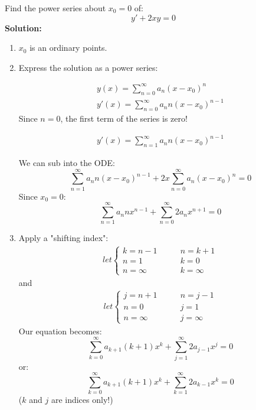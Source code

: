\begin{exmp}{}
Find the power series about $x_0=0$ of:
\begin{equation*}
y'+2xy=0
\end{equation*}
\textbf{Solution:}\\
\begin{enumerate}
\item $x_0$ is an ordinary points.
\item Express the solution as a power series:

\begin{align*}
y(x) = \sum^\infty_{n=0} a_n\left(x-x_0\right)^n\\
y'(x) = \sum^\infty_{n=0} a_n n\left(x-x_0\right)^{n-1}
\end{align*}
Since $n=0$, the first term of the series is zero!

\begin{align*}
y'(x) = \sum^\infty_{n=1} a_n n\left(x-x_0\right)^{n-1}
\end{align*}

We can sub into the ODE:
\begin{equation*}
\sum^\infty_{n=1} a_n n\left(x-x_0\right)^{n-1}+2x\sum^\infty_{n=0} a_n\left(x-x_0\right)^n=0
\end{equation*}
Since $x_0=0$:
\begin{equation*}
\sum^\infty_{n=1} a_n nx^{n-1}+\sum^\infty_{n=0} 2a_nx^{n+1}=0 %
\end{equation*}
\item Apply a "shifting index":
\begin{align*}
let \begin{cases}
k=n-1 \qquad &n=k+1\\
n=1 &k=0\\
n=\infty &k=\infty
\end{cases}
\end{align*}
 and 
 \begin{align*}
let \begin{cases}
j=n+1 \qquad &n=j-1\\
n=0 &j=1\\
n=\infty &j=\infty
\end{cases}
\end{align*}
Our equation becomes:
\begin{equation*}
\sum^\infty_{k=0} a_{k+1} (k+1) x^{k}+\sum^\infty_{j=1}2 a_{j-1}x^{j}=0
\end{equation*}
or:
\begin{equation*}
\sum^\infty_{k=0} a_{k+1} (k+1) x^{k}+\sum^\infty_{k=1}2 a_{k-1}x^{k}=0
\end{equation*}
($k$ and $j$ are indices only!)


\end{enumerate}
\end{exmp}
